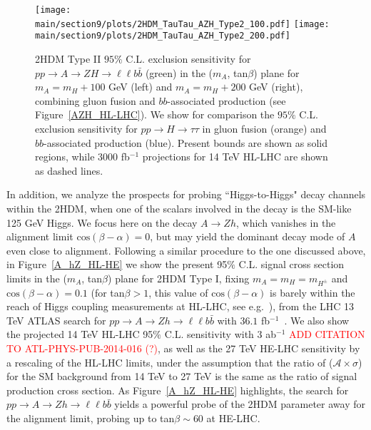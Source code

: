 \begin{figure}[h!]
\begin{center}
\texttt{[image: \\main/section9/plots/2HDM\_TauTau\_AZH\_Type2\_100.pdf]}
\hspace{3mm}
\texttt{[image: \\main/section9/plots/2HDM\_TauTau\_AZH\_Type2\_200.pdf]}
\caption{\small 2HDM Type II $95\%$ C.L. exclusion sensitivity for $p p \to A \to Z H \to \ell\ell b \bar{b}$  (green)
in the ($m_{A}$, tan$\beta$) plane for $m_A = m_H +100$ GeV (left) and $m_A = m_H +200$ GeV (right), combining 
gluon fusion and $bb$-associated production (see Figure~\ref{AZH_HL-LHC}). We show for comparison
the $95\%$ C.L. exclusion sensitivity for $p p \to H \to \tau\tau$ in gluon fusion (orange) 
and $bb$-associated production (blue). Present bounds are shown as solid regions, while $3000$ fb$^{-1}$ projections for 14 TeV HL-LHC are shown as dashed lines.}
\label{TauTau_AZH_HL-HE}
\end{center}
\end{figure}

In addition, we analyze the prospects for probing ``Higgs-to-Higgs" decay channels within the 2HDM, when one of the scalars involved in the decay is the SM-like 125 GeV Higgs. We focus here on the decay $A \to Z h$, which vanishes in the alignment limit $\mathrm{cos}(\beta - \alpha) = 0$, but may yield the dominant decay mode of $A$ even close to alignment. Following a similar procedure to the one discussed above, in Figure~\ref{A_hZ_HL-HE} we show the present 95$\%$ C.L. signal cross section limits in the ($m_{A}$, tan$\beta$) plane for 2HDM Type I, fixing $m_A = m_H = m_{H^{\pm}}$ and $\mathrm{cos}(\beta-\alpha) = 0.1$ (for tan$\beta > 1$, this value of $\mathrm{cos}(\beta-\alpha)$ is barely within the reach of Higgs coupling measurements at HL-LHC, see e.g.~\cite{ATL-PHYS-PUB-2014-017}), from the LHC 13 TeV ATLAS search for $p p \to A \to Z h \to \ell\ell b \bar{b}$ with $36.1$ fb$^{-1}$~\cite{Aaboud:2017cxo}. We also show the projected 14 TeV HL-LHC 95$\%$ C.L. sensitivity with $3$ ab$^{-1}$ \textcolor{red}{ADD CITATION TO ATL-PHYS-PUB-2014-016 (?)}, as well as the 27 TeV HE-LHC sensitivity by a rescaling of the HL-LHC limits, under the assumption that the ratio of ($\mathcal{A} \times \sigma$) for the SM background from 14 TeV to 27 TeV is the same as the ratio of signal production cross section.
As Figure~\ref{A_hZ_HL-HE} highlights, the search for $p p \to A \to Z h \to \ell\ell b \bar{b}$ yields a powerful probe of the 2HDM parameter away for the alignment limit, probing up to tan$\beta \sim 60$ at HE-LHC.

